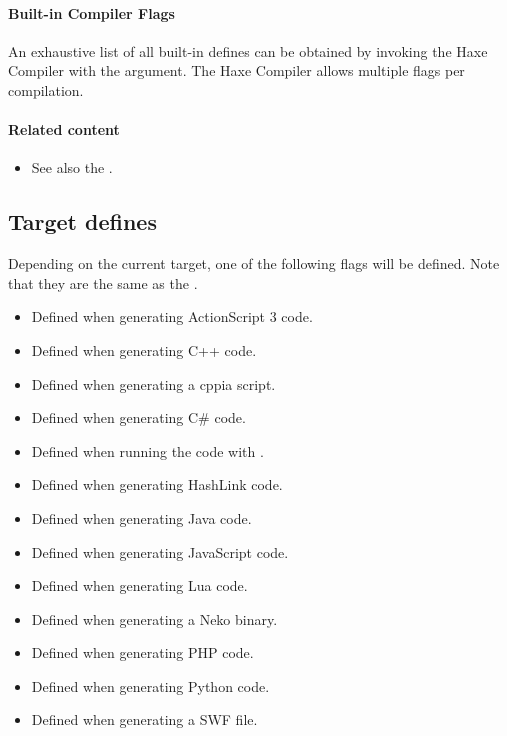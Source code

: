 \paragraph{Built-in Compiler Flags}
An exhaustive list of all built-in defines can be obtained by invoking the Haxe Compiler with the  argument. The Haxe Compiler allows multiple  flags per compilation.

\paragraph{Related content}
\begin{itemize}
	\item See also the .
\end{itemize}

\subsection{Target defines}
\label{lf-target-defines}

Depending on the current target, one of the following flags will be defined. Note that they are the same as the .

\begin{itemize}
	\item[\ic{as3}] Defined when generating ActionScript 3 code.
	\item[\ic{cpp}] Defined when generating C++ code.
	\item[\ic{cppia}] Defined when generating a cppia script.
	\item[\ic{cs}] Defined when generating C\# code.
	\item[\ic{eval}] Defined when running the code with .
	\item[\ic{hl}] Defined when generating HashLink code.
	\item[\ic{java}] Defined when generating Java code.
	\item[\ic{js}] Defined when generating JavaScript code.
	\item[\ic{lua}] Defined when generating Lua code.
	\item[\ic{neko}] Defined when generating a Neko binary.
	\item[\ic{php}] Defined when generating PHP code.
	\item[\ic{python}] Defined when generating Python code.
	\item[\ic{swf}] Defined when generating a SWF file.
\end{itemize}

